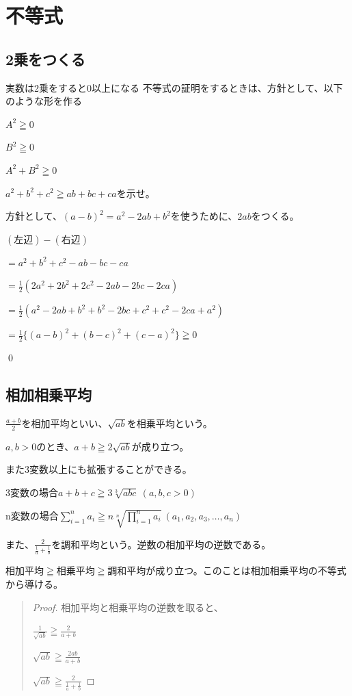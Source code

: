 \documentclass[uplatex,dvipdfmx]{jsbook}
\begin{document}
\section{不等式}
\subsection{2乗をつくる}
実数は2乗をすると0以上になる
不等式の証明をするときは、方針として、以下のような形を作る

$A^2\geqq 0$

$B^2\geqq 0$

$A^2+B^2\geqq 0$

\begin{problem}[練習問題]
    $a^2+b^2+c^2\geqq ab+bc+ca$を示せ。
\end{problem}

\begin{answer}
    方針として、$\left(a- b\right)^2=a^2-2ab+b^2$を使うために、$2ab$をつくる。

    $\left(\text{左辺}\right)-\left(\text{右辺}\right)$

    $=a^2+b^2+c^2-ab-bc-ca$

    $\displaystyle =\frac{1}{2}\left(2a^2+2b^2+2c^2-2ab-2bc-2ca\right)$

    $\displaystyle =\frac{1}{2}\left(a^2-2ab+b^2+b^2-2bc+c^2+c^2-2ca+a^2\right)$

    $\displaystyle =\frac{1}{2}\{\left(a-b\right)^2+\left(b-c\right)^2+\left(c-a\right)^2\}\geqq 0$

    \qed
\end{answer}

\subsection{相加相乗平均}
$\displaystyle \frac{a+b}{2}$を相加平均といい、$\sqrt{ab}$を相乗平均という。

$a,b>0$のとき、$a+b\geqq2\sqrt{ab}$が成り立つ。

また3変数以上にも拡張することができる。

3変数の場合$a+b+c\geqq 3\sqrt[3]{abc}\ \left(a,b,c>0\right)$

n変数の場合$\displaystyle \sum_{i=1}^n a_i\geqq n\sqrt[n]{\prod_{i=1}^n a_i}\ \left(a_1,a_2,a_3,\dots,a_n\right)$

また、$\displaystyle \frac{2}{\frac{1}{a}+\frac{1}{b}}$を調和平均という。逆数の相加平均の逆数である。

相加平均$\geqq$相乗平均$\geqq$調和平均が成り立つ。このことは相加相乗平均の不等式から導ける。
\begin{quote}
    \begin{proof}
        相加平均と相乗平均の逆数を取ると、

        $\displaystyle \frac{1}{\sqrt{ab}}\geqq\frac{2}{a+b}$

        $\displaystyle \sqrt{ab}\geqq\frac{2ab}{a+b}$

        $\displaystyle \sqrt{ab}\geqq\frac{2}{\frac{1}{a}+\frac{1}{b}}$
    \end{proof}
\end{quote}
\end{document}

